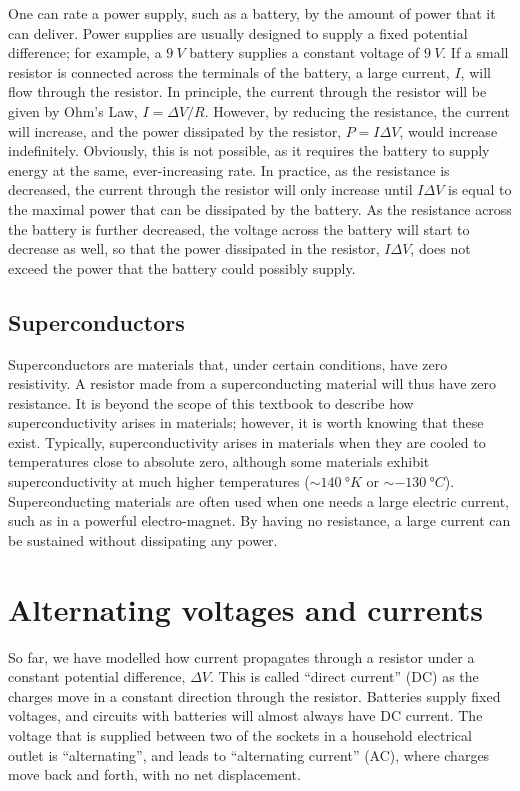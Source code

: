 One can rate a power supply, such as a battery, by the amount of power that it can deliver. Power supplies are usually designed to supply a fixed potential difference; for example, a $\SI{9}{V}$ battery supplies a constant voltage of $\SI{9}{V}$. If a small resistor is connected across the terminals of the battery, a large current, $I$, will flow through the resistor. In principle, the current through the resistor will be given by Ohm's Law, $I=\Delta V/R$. However, by reducing the resistance, the current will increase, and the power dissipated by the resistor, $P=I\Delta V $, would increase indefinitely. Obviously, this is not possible, as it requires the battery to supply energy at the same, ever-increasing rate. In practice, as the resistance is decreased, the current through the resistor will only increase until $I \Delta V$ is equal to the maximal power that can be dissipated by the battery. As the resistance across the battery is further decreased, the voltage across the battery will start to decrease as well, so that the power dissipated in the resistor, $I \Delta V$, does not exceed the power that the battery could possibly supply.

\subsection{Superconductors}
Superconductors are materials that, under certain conditions, have zero resistivity. A resistor made from a superconducting material will thus have zero resistance. It is beyond the scope of this textbook to describe how superconductivity arises in materials; however, it is worth knowing that these exist. Typically, superconductivity arises in materials when they are cooled to temperatures close to absolute zero, although some materials exhibit superconductivity at much higher temperatures ($\sim\SI{140}{\degree K}$ or $\sim\SI{-130}{\degree C}$). Superconducting materials are often used when one needs a large electric current, such as in a powerful electro-magnet. By having no resistance, a large current can be sustained without dissipating any power.


\section{Alternating voltages and currents}
So far, we have modelled how current propagates through a resistor under a constant potential difference, $\Delta V$. This is called ``direct current'' (DC) as the charges move in a constant direction through the resistor. Batteries supply fixed voltages, and circuits with batteries will almost always have DC current. The voltage that is supplied between two of the sockets in a household electrical outlet is ``alternating'', and leads to ``alternating current'' (AC), where charges move back and forth, with no net displacement.

